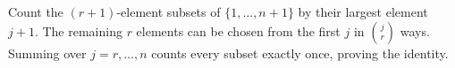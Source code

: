 Count the $(r+1)$-element subsets of $\{1,\ldots,n+1\}$ by their largest element $j+1$. The remaining $r$ elements can be chosen from the first $j$ in $\binom jr$ ways. Summing over $j=r,\ldots,n$ counts every subset exactly once, proving the identity.
